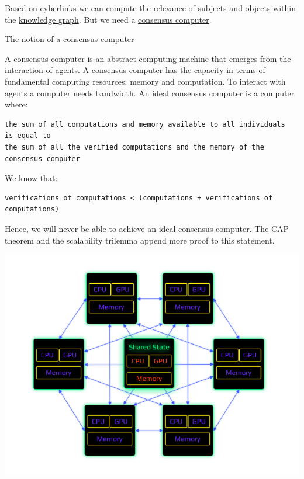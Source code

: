 \documentclass[8pt,oneside]{amsart}
\makeatletter
\renewcommand\subsection{\@startsection{subsection}
                                    {2}{\z@}
                                    {-3.25ex\@plus -1ex \@minus -.2ex}
                                    {0ex \@plus .2ex}
                                    {\play\Large}
                        }
\newcommand{\titleSection}[1]{\subsection{#1}}
\newenvironment{Figure}
  {\par\medskip\noindent\minipage{\linewidth}}
  {\endminipage\par\medskip}
\makeatother
\begin{document}
Based on cyberlinks we can compute the relevance of subjects and objects within the {\hyperref[knowledge-graph]{knowledge graph}}. But we need a {\hyperref[consensus-computer]{consensus computer}}.

\titleSection{The notion of a consensus computer}\label{consensus-computer}

A consensus computer is an abstract computing machine that emerges from the interaction of agents. A consensus computer has the capacity in terms of fundamental computing resources: memory and computation. To interact with agents a computer needs bandwidth. An ideal consensus computer is a computer where:
\\
\begin{lstlisting}
the sum of all computations and memory available to all individuals
is equal to
the sum of all the verified computations and the memory of the consensus computer
\end{lstlisting}

We know that:

\begin{lstlisting}
verifications of computations < (computations + verifications of computations)
\end{lstlisting}

Hence, we will never be able to achieve an ideal consensus computer. The CAP theorem and the scalability trilemma append more proof to this statement.

\begin{Figure}
    \centering
    \includegraphics[width=1\textwidth]{consensus-computer.png}
\end{Figure}
\end{document}
